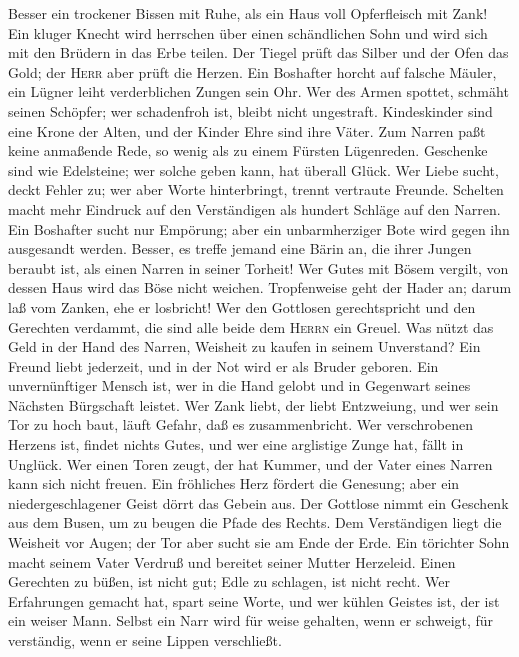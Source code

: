 Besser ein trockener Bissen mit Ruhe, als ein Haus voll
Opferfleisch mit Zank!  Ein kluger Knecht wird herrschen
über einen schändlichen Sohn und wird sich mit den Brüdern in das Erbe
teilen.  Der Tiegel prüft das Silber und der Ofen das
Gold; der \textsc{Herr} aber prüft die Herzen.  Ein
Boshafter horcht auf falsche Mäuler, ein Lügner leiht verderblichen
Zungen sein Ohr.  Wer des Armen spottet, schmäht seinen
Schöpfer; wer schadenfroh ist, bleibt nicht ungestraft. 
Kindeskinder sind eine Krone der Alten, und der Kinder Ehre sind ihre
Väter.  Zum Narren paßt keine anmaßende Rede, so wenig als
zu einem Fürsten Lügenreden.  Geschenke sind wie
Edelsteine; wer solche geben kann, hat überall Glück.  Wer
Liebe sucht, deckt Fehler zu; wer aber Worte hinterbringt, trennt
vertraute Freunde.  Schelten macht mehr Eindruck auf den
Verständigen als hundert Schläge auf den Narren.  Ein
Boshafter sucht nur Empörung; aber ein unbarmherziger Bote wird gegen
ihn ausgesandt werden.  Besser, es treffe jemand eine
Bärin an, die ihrer Jungen beraubt ist, als einen Narren in seiner
Torheit!  Wer Gutes mit Bösem vergilt, von dessen Haus
wird das Böse nicht weichen.  Tropfenweise geht der Hader
an; darum laß vom Zanken, ehe er losbricht!  Wer den
Gottlosen gerechtspricht und den Gerechten verdammt, die sind alle beide
dem \textsc{Herrn} ein Greuel.  Was nützt das Geld in der
Hand des Narren, Weisheit zu kaufen in seinem Unverstand?
 Ein Freund liebt jederzeit, und in der Not wird er als
Bruder geboren.  Ein unvernünftiger Mensch ist, wer in
die Hand gelobt und in Gegenwart seines Nächsten Bürgschaft leistet.
 Wer Zank liebt, der liebt Entzweiung, und wer sein Tor
zu hoch baut, läuft Gefahr, daß es zusammenbricht.  Wer
verschrobenen Herzens ist, findet nichts Gutes, und wer eine arglistige
Zunge hat, fällt in Unglück.  Wer einen Toren zeugt, der
hat Kummer, und der Vater eines Narren kann sich nicht freuen.
 Ein fröhliches Herz fördert die Genesung; aber ein
niedergeschlagener Geist dörrt das Gebein aus.  Der
Gottlose nimmt ein Geschenk aus dem Busen, um zu beugen die Pfade des
Rechts.  Dem Verständigen liegt die Weisheit vor Augen;
der Tor aber sucht sie am Ende der Erde.  Ein törichter
Sohn macht seinem Vater Verdruß und bereitet seiner Mutter Herzeleid.
 Einen Gerechten zu büßen, ist nicht gut; Edle zu
schlagen, ist nicht recht.  Wer Erfahrungen gemacht hat,
spart seine Worte, und wer kühlen Geistes ist, der ist ein weiser Mann.
 Selbst ein Narr wird für weise gehalten, wenn er
schweigt, für verständig, wenn er seine Lippen verschließt.

